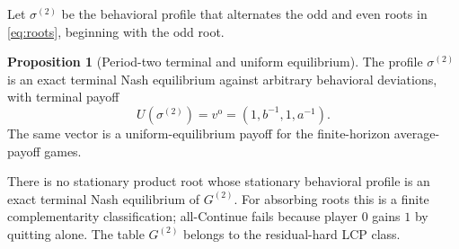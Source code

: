 \documentclass[11pt]{article}
\theoremstyle{definition}
\newtheorem{proposition}{Proposition}
\begin{document}
Let $\sigma^{(2)}$ be the behavioral profile that alternates the odd and even
roots in \eqref{eq:roots}, beginning with the odd root.

\begin{proposition}[Period-two terminal and uniform equilibrium]
The profile $\sigma^{(2)}$ is an exact terminal Nash equilibrium against
arbitrary behavioral deviations, with terminal payoff
\[
 U(\sigma^{(2)})=v^{\mathrm o}=(1,b^{-1},1,a^{-1}).
\]
The same vector is a uniform-equilibrium payoff for the finite-horizon
average-payoff games.

There is no stationary product root whose stationary behavioral profile is
an exact terminal Nash equilibrium of $G^{(2)}$.  For absorbing roots this is
a finite complementarity classification; all-Continue fails because player
$0$ gains $1$ by quitting alone.  The table $G^{(2)}$ belongs to the
residual-hard LCP class.
\end{proposition}
\end{document}
